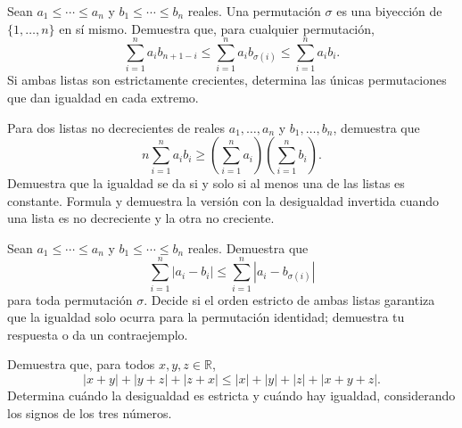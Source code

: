 \begin{samepage}
\begin{problem}\label{prob:reto-orden-08}
Sean $a_1\le\cdots\le a_n$ y $b_1\le\cdots\le b_n$ reales. Una permutación $\sigma$ es una biyección de $\{1,\ldots,n\}$ en sí mismo. Demuestra que, para cualquier permutación,
\[
\sum_{i=1}^n a_i b_{n+1-i}
\le\sum_{i=1}^n a_i b_{\sigma(i)}
\le\sum_{i=1}^n a_i b_i.
\]
Si ambas listas son estrictamente crecientes, determina las únicas permutaciones que dan igualdad en cada extremo.~\cite{mseReordenamiento}
\end{problem}
\end{samepage}
\par{}

\begin{samepage}
\begin{problem}\label{prob:reto-orden-09}
Para dos listas no decrecientes de reales $a_1,\ldots,a_n$ y $b_1,\ldots,b_n$, demuestra que
\[
n\sum_{i=1}^n a_i b_i
\ge\left(\sum_{i=1}^n a_i\right)\left(\sum_{i=1}^n b_i\right).
\]
Demuestra que la igualdad se da si y solo si al menos una de las listas es constante. Formula y demuestra la versión con la desigualdad invertida cuando una lista es no decreciente y la otra no creciente.
\end{problem}
\end{samepage}
\par{}

\begin{samepage}
\begin{problem}\label{prob:reto-orden-10}
Sean $a_1\le\cdots\le a_n$ y $b_1\le\cdots\le b_n$ reales. Demuestra que
\[
\sum_{i=1}^n|a_i-b_i|
\le\sum_{i=1}^n|a_i-b_{\sigma(i)}|
\]
para toda permutación $\sigma$. Decide si el orden estricto de ambas listas garantiza que la igualdad solo ocurra para la permutación identidad; demuestra tu respuesta o da un contraejemplo.~\cite{mseDistanciasOrden}
\end{problem}
\end{samepage}
\par{}

\begin{samepage}
\begin{problem}\label{prob:reto-absoluto-01}
Demuestra que, para todos $x,y,z\in\mathbb R$,
\[
|x+y|+|y+z|+|z+x|
\le |x|+|y|+|z|+|x+y+z|.
\]
Determina cuándo la desigualdad es estricta y cuándo hay igualdad, considerando los signos de los tres números.~\cite{mseHlawka}
\end{problem}
\end{samepage}
\par{}

